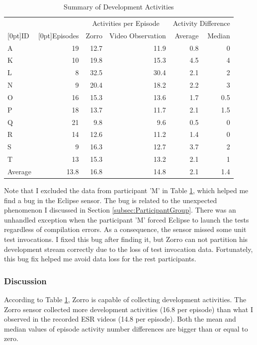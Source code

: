 \begin{table}[!ht]
\centering
  \begin{tabular}{|l|r|r|r|r|r|}
  \hline
    &  &  \multicolumn{2}{c|}{Activities per Episode} & 
          \multicolumn{2}{c|}{Activity Difference} \\ \cline{3-6}
    \raisebox{1.5ex}[0pt]{ID} & \raisebox{1.5ex}[0pt]{Episodes}  & 
                 Zorro & Video Observation & Average & Median \\ \hline
         A  & 19   & 12.7 & 11.9 & 0.8 & 0   \\ \hline  
         K  & 10   & 19.8 & 15.3 & 4.5 & 4   \\ \hline
         L  &  8   & 32.5 & 30.4 & 2.1 & 2   \\ \hline  
         N  &  9   & 20.4 & 18.2 & 2.2 & 3   \\ \hline
         O  & 16   & 15.3 & 13.6 & 1.7 & 0.5 \\ \hline
         P  & 18   & 13.7 & 11.7 & 2.1 & 1.5 \\ \hline
         Q  & 21   &  9.8 &  9.6 & 0.5 & 0   \\ \hline
         R  & 14   & 12.6 & 11.2 & 1.4 & 0   \\ \hline
         S  &  9   & 16.3 & 12.7 & 3.7 & 2   \\ \hline
         T  & 13   & 15.3 & 13.2 & 2.1 & 1   \\ \hline
    Average & 13.8 & 16.8 & 14.8 & 2.1 & 1.4 \\ \hline 
    \end{tabular}
  \caption{Summary of Development Activities}\label{tab:ActivityNumberSummary} 
\end{table}

Note that I excluded the data from participant 'M' in Table \ref{tab:ActivityNumberSummary},
which helped me find a bug in the Eclipse sensor. The bug is related to
the unexpected phenomenon I discussed in Section \ref{subsec:ParticipantGroup}.
There was an unhandled exception when the participant 'M' forced Eclipse
to launch the tests regardless of compilation errors. As a consequence, the 
sensor missed some unit test invocations. I fixed this bug after
finding it, but Zorro can not partition his development stream correctly 
due to the loss of test invocation data. Fortunately, this bug fix helped 
me avoid data loss for the rest participants. 

\subsubsection{Discussion}
According to Table \ref{tab:ActivityNumberSummary}, Zorro is capable of
collecting development activities. The Zorro sensor collected more 
development activities (16.8 per episode) than what I observed in the
recorded ESR videos (14.8 per episode). Both the mean and median values
of episode activity number differences are bigger than or equal to zero.  

